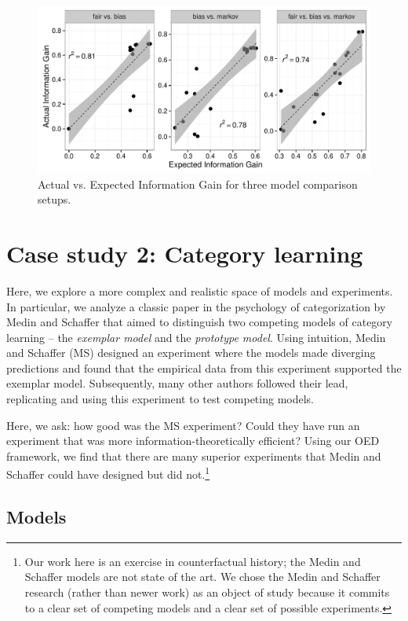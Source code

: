 \documentclass{article}
\begin{document}
\begin{figure}[t]
\centering
\includegraphics[width=0.7\columnwidth]{img/coin_eig_aig_scatter_noText.pdf}
\caption{Actual vs. Expected Information Gain for three model comparison setups.}
\label{fig:aig_vs_eig}
\end{figure}

\section{Case study 2: Category learning}

Here, we explore a more complex and realistic space of models and experiments.
In particular, we analyze a classic paper in the psychology of categorization by Medin and Schaffer \cite{medin78:pr} that aimed to distinguish two competing models of category learning -- the \emph{exemplar model} and the \emph{prototype model}.
Using intuition, Medin and Schaffer (MS) designed an experiment where the models made diverging predictions and found that the empirical data from this experiment supported the exemplar model.
Subsequently, many other authors followed their lead, replicating and using this experiment to test competing models.

Here, we ask: how good was the MS experiment?
Could they have run an experiment that was more information-theoretically efficient?
Using our OED framework, we find that there are many superior experiments that Medin and Schaffer could have designed but did not.\footnote{Our work here is an exercise in counterfactual history; the Medin and Schaffer models are not state of the art. We chose the Medin and Schaffer research (rather than newer work) as an object of study because it commits to a clear set of competing models and a clear set of possible experiments.}



\subsection{Models}
\end{document}
